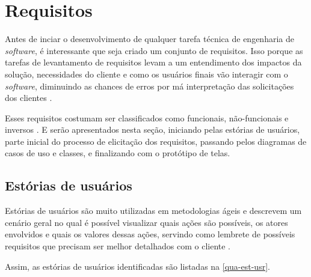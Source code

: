 \section{Requisitos}

Antes de inciar o desenvolvimento de qualquer tarefa técnica de engenharia de \emph{software}, é interessante que seja criado
um conjunto de requisitos.
Isso porque as tarefas de levantamento de requisitos levam a um entendimento dos impactos da solução, necessidades do cliente e
como os usuários finais vão interagir com o \emph{software}, diminuindo as chances de erros por má interpretação das solicitações
dos clientes \cite{pressman2014software}.

Esses requisitos costumam ser classificados como funcionais, não-funcionais e inversos \cite{sommerville2007engenharia}.
E serão apresentados nesta seção, iniciando pelas estórias de usuários, parte inicial do processo de elicitação
dos requisitos, passando pelos diagramas de casos de uso e classes, e finalizando com o protótipo de telas.

\newpage

\subsection{Estórias de usuários}

Estórias de usuários são muito utilizadas em metodologias ágeis e descrevem um cenário geral no qual é possível visualizar
quais ações são possíveis, os atores envolvidos e quais os valores dessas ações, servindo como lembrete
de possíveis requisitos que precisam ser melhor detalhados com o cliente \cite{nawrocki2014agile}.

Assim, as estórias de usuários identificadas são listadas na \autoref{qua-est-usr}.

